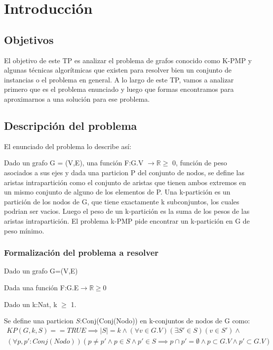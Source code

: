 \section*{Introducción}

\subsection*{Objetivos}

El objetivo de este TP es analizar el problema de grafos conocido como K-PMP y algunas t\'ecnicas algor\'itmicas que existen para resolver bien un conjunto de instancias o el problema en general.
A lo largo de este TP, vamos a analizar primero que es el problema enunciado y luego que formas encontramos para aproximarnos a una soluci\'on para ese problema.

\subsection*{Descripci\'on del problema}

El enunciado del problema lo describe as\'i:

Dado un grafo G = (V,E), una funci\'on F:G.V $\rightarrow \mathbb{R} \geq$ 0, funci\'on de peso asociados a sus ejes y dada una particion P del conjunto de nodos, se define las aristas intrapartici\'on como el conjunto de aristas que tienen ambos extremos en un mismo conjunto de alguno de los elementos de P.
Una k-partici\'on es un partici\'on de los nodos de G, que tiene exactamente k subconjuntos, los cuales podrian ser vacios. Luego el peso de un k-partici\'on es la suma de los pesos de las aristas intrapartici\'on.
El problema k-PMP pide encontrar un k-partici\'on en G de peso m\'inimo.

\subsubsection*{Formalizaci\'on del problema a resolver}


Dado un grafo G=(V,E)

Dada una funci\'on F:G.E$\rightarrow$$\mathbb{R} \geq 0$

Dado un k:Nat, k $\geq$ 1.

Se define una particion $S$:Conj(Conj(Nodo)) en k-conjuntos de nodos de G como:
\begin{align*}
KP(G,k,S)==TRUE \implies
|S|=k \wedge (\forall v \in G.V)(\exists S'\in S)(v \in S') \wedge \\
(\forall p,p':Conj(Nodo))(p \neq p' \wedge p \in S \wedge p' \in S \implies p \cap p' = \emptyset \wedge p \subset G.V \wedge p' \subset G.V)   
\end{align*}

